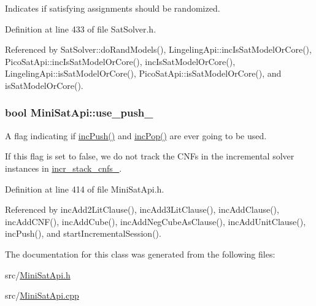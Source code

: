 Indicates if satisfying assignments should be randomized. 



Definition at line 433 of file Sat\-Solver.\-h.



Referenced by Sat\-Solver\-::do\-Rand\-Models(), Lingeling\-Api\-::inc\-Is\-Sat\-Model\-Or\-Core(), Pico\-Sat\-Api\-::inc\-Is\-Sat\-Model\-Or\-Core(), inc\-Is\-Sat\-Model\-Or\-Core(), Lingeling\-Api\-::is\-Sat\-Model\-Or\-Core(), Pico\-Sat\-Api\-::is\-Sat\-Model\-Or\-Core(), and is\-Sat\-Model\-Or\-Core().

\hypertarget{classMiniSatApi_a9d1530348f713264a41d6115e4cfb62e}{
\subsubsection[{use\-\_\-push\-\_\-}]{\setlength{\rightskip}{0pt plus 5cm}bool Mini\-Sat\-Api\-::use\-\_\-push\-\_\-\hspace{0.3cm}{\ttfamily [protected]}}}\label{classMiniSatApi_a9d1530348f713264a41d6115e4cfb62e}


A flag indicating if \hyperlink{classMiniSatApi_a27013ace25320f68252bef5ba9f2e9ad}{inc\-Push()} and \hyperlink{classMiniSatApi_af388f97db15f77baeb420a8fef74ca6a}{inc\-Pop()} are ever going to be used. 

If this flag is set to false, we do not track the C\-N\-Fs in the incremental solver instances in \hyperlink{classMiniSatApi_aca2da2d02879e4a05c09124ff84cc4cd}{incr\-\_\-stack\-\_\-cnfs\-\_\-}. 

Definition at line 414 of file Mini\-Sat\-Api.\-h.



Referenced by inc\-Add2\-Lit\-Clause(), inc\-Add3\-Lit\-Clause(), inc\-Add\-Clause(), inc\-Add\-C\-N\-F(), inc\-Add\-Cube(), inc\-Add\-Neg\-Cube\-As\-Clause(), inc\-Add\-Unit\-Clause(), inc\-Push(), and start\-Incremental\-Session().



The documentation for this class was generated from the following files\-:\begin{DoxyCompactItemize}
\item 
src/\hyperlink{MiniSatApi_8h}{Mini\-Sat\-Api.\-h}\item 
src/\hyperlink{MiniSatApi_8cpp}{Mini\-Sat\-Api.\-cpp}\end{DoxyCompactItemize}
